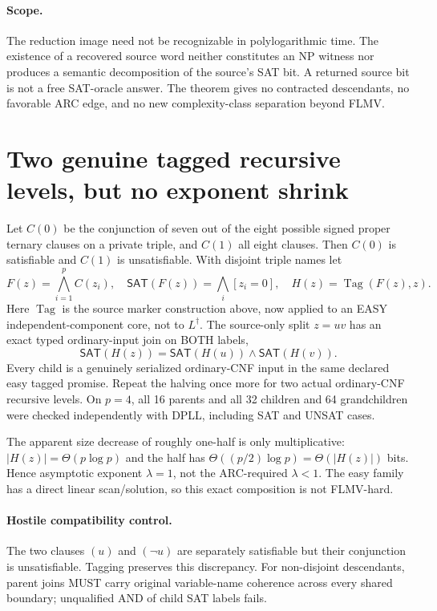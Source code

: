 \documentclass[11pt]{article}
\newcommand{\SAT}{\mathsf{SAT}}
\begin{document}
\paragraph{Scope.}
The reduction image need not be recognizable in polylogarithmic time.
The existence of a recovered source word neither constitutes an
NP witness nor produces a semantic decomposition of the source's
SAT bit. A returned source bit is not a free SAT-oracle answer.
The theorem gives no contracted descendants, no favorable ARC edge,
and no new complexity-class separation beyond FLMV.

\section{Two genuine tagged recursive levels, but no exponent shrink}
Let $C(0)$ be the conjunction of seven out of the eight possible
signed proper ternary clauses on a private triple, and $C(1)$
all eight clauses. Then $C(0)$ is satisfiable and $C(1)$ is
unsatisfiable. With disjoint triple names let
\[
 F(z)=\bigwedge_{i=1}^{p} C(z_i),\quad
 \SAT(F(z))=\bigwedge_i [z_i=0],\quad
 H(z)=\operatorname{Tag}(F(z),z).
\]
Here $\operatorname{Tag}$ is the source marker construction above,
now applied to an EASY independent-component core, not to
$L^\dagger$. The source-only split $z=uv$ has an exact typed
ordinary-input join on BOTH labels,
\[
 \SAT(H(z))=\SAT(H(u))\land\SAT(H(v)).
\]
Every child is a genuinely serialized ordinary-CNF input in
the same declared easy tagged promise. Repeat the halving once more
for two actual ordinary-CNF recursive levels. On $p=4$, all
16 parents and all 32 children and 64 grandchildren were checked
independently with DPLL, including SAT and UNSAT cases.

The apparent size decrease of roughly one-half is only
multiplicative: $|H(z)|=\Theta(p\log p)$ and the half
has $\Theta((p/2)\log p)=\Theta(|H(z)|)$ bits.
Hence asymptotic exponent $\lambda=1$, not the ARC-required
$\lambda<1$. The easy family has a direct linear scan/solution,
so this exact composition is not FLMV-hard.

\paragraph{Hostile compatibility control.}
The two clauses $(u)$ and $(\neg u)$ are separately satisfiable
but their conjunction is unsatisfiable. Tagging preserves this
discrepancy. For non-disjoint descendants, parent joins MUST
carry original variable-name coherence across every shared
boundary; unqualified AND of child SAT labels fails.
\end{document}
